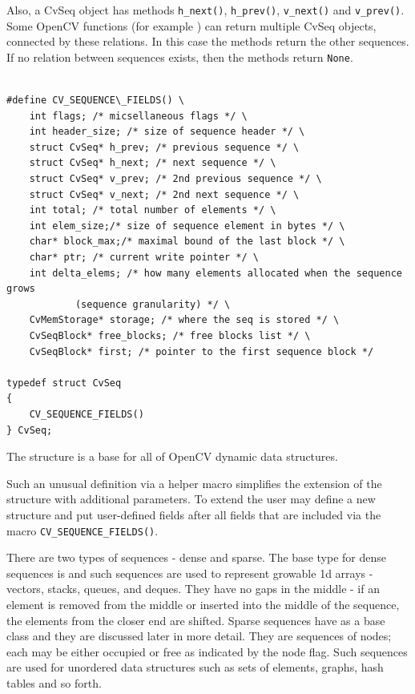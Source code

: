 Also, a CvSeq object has methods
\texttt{h_next()},
\texttt{h_prev()},
\texttt{v_next()} and
\texttt{v_prev()}.
Some OpenCV functions (for example ) can return multiple CvSeq objects, connected by these relations.
In this case the methods return the other sequences.  If no relation between sequences exists, then the methods return \texttt{None}.

\fi

\ifC
\begin{lstlisting}

#define CV_SEQUENCE\_FIELDS() \
    int flags; /* micsellaneous flags */ \
    int header_size; /* size of sequence header */ \
    struct CvSeq* h_prev; /* previous sequence */ \
    struct CvSeq* h_next; /* next sequence */ \
    struct CvSeq* v_prev; /* 2nd previous sequence */ \
    struct CvSeq* v_next; /* 2nd next sequence */ \
    int total; /* total number of elements */ \
    int elem_size;/* size of sequence element in bytes */ \
    char* block_max;/* maximal bound of the last block */ \
    char* ptr; /* current write pointer */ \
    int delta_elems; /* how many elements allocated when the sequence grows 
			(sequence granularity) */ \
    CvMemStorage* storage; /* where the seq is stored */ \
    CvSeqBlock* free_blocks; /* free blocks list */ \
    CvSeqBlock* first; /* pointer to the first sequence block */

typedef struct CvSeq
{
    CV_SEQUENCE_FIELDS()
} CvSeq;

\end{lstlisting}

The structure  is a base for all of OpenCV dynamic data structures.

Such an unusual definition via a helper macro simplifies the extension
of the structure \cross{CvSeq} with additional parameters. To extend
\cross{CvSeq} the user may define a new structure and put user-defined
fields after all \cross{CvSeq} fields that are included via the macro
\texttt{CV\_SEQUENCE\_FIELDS()}.

There are two types of sequences - dense and sparse. The base type for dense
sequences is \cross{CvSeq} and such sequences are used to represent
growable 1d arrays - vectors, stacks, queues, and deques. They have no gaps
in the middle - if an element is removed from the middle or inserted
into the middle of the sequence, the elements from the closer end are
shifted. Sparse sequences have  as a base class and they are
discussed later in more detail. They are sequences of nodes; each may be either occupied or free as indicated by the node flag. Such
sequences are used for unordered data structures such as sets of elements,
graphs, hash tables and so forth.

